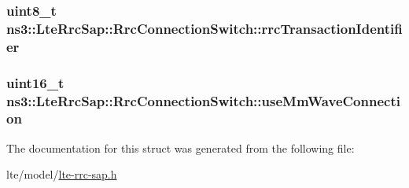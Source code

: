 \subsubsection[{\texorpdfstring{rrc\+Transaction\+Identifier}{rrcTransactionIdentifier}}]{\setlength{\rightskip}{0pt plus 5cm}uint8\+\_\+t ns3\+::\+Lte\+Rrc\+Sap\+::\+Rrc\+Connection\+Switch\+::rrc\+Transaction\+Identifier}\hypertarget{structns3_1_1LteRrcSap_1_1RrcConnectionSwitch_a021a528acde54bc37e6e4580581e7b63}{}\label{structns3_1_1LteRrcSap_1_1RrcConnectionSwitch_a021a528acde54bc37e6e4580581e7b63}
\subsubsection[{\texorpdfstring{use\+Mm\+Wave\+Connection}{useMmWaveConnection}}]{\setlength{\rightskip}{0pt plus 5cm}uint16\+\_\+t ns3\+::\+Lte\+Rrc\+Sap\+::\+Rrc\+Connection\+Switch\+::use\+Mm\+Wave\+Connection}\hypertarget{structns3_1_1LteRrcSap_1_1RrcConnectionSwitch_a9b44955f7fbd9febc3d1c1a57abbc1b3}{}\label{structns3_1_1LteRrcSap_1_1RrcConnectionSwitch_a9b44955f7fbd9febc3d1c1a57abbc1b3}


The documentation for this struct was generated from the following file\+:\begin{DoxyCompactItemize}
\item 
lte/model/\hyperlink{lte-rrc-sap_8h}{lte-\/rrc-\/sap.\+h}\end{DoxyCompactItemize}

